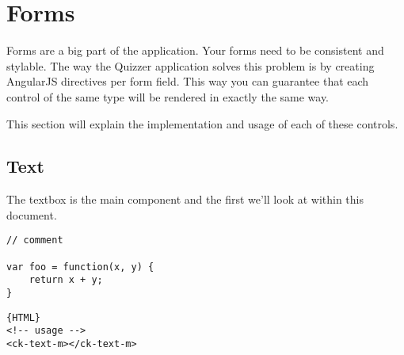 
\section{Forms}
Forms are a big part of the application. Your forms need to be consistent and stylable. The way the Quizzer application solves this problem is by creating AngularJS directives per form field. This way you can guarantee that each control of the same type will be rendered in exactly the same way.

This section will explain the implementation and usage of each of these controls.

\subsection{Text}
The textbox is the main component and the first we’ll look at within this document.

\begin{lstlisting}
// comment

var foo = function(x, y) {
    return x + y;
}
\end{lstlisting}

\begin{lstlisting}{HTML}
<!-- usage -->
<ck-text-m></ck-text-m>
\end{lstlisting}

\pagebreak
